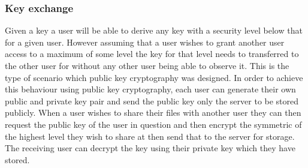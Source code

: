\documentclass[12pt, titlepage]{article}
\begin{document}
\subsubsection{Key exchange}
Given a key a user will be able to derive any key with a security level below that for a given user. However assuming that a user wishes to grant another user access to a maximum of some level the key for that level needs to transferred to the other user for without any other user being able to observe it. This is the type of scenario which public key cryptography was designed. In order to achieve this behaviour using public key cryptography, each user can generate their own public and private key pair and send the public key only the server to be stored publicly. When a user wishes to share their files with another user they can then request the public key of the user in question and then encrypt the symmetric of the highest level they wish to share at then send that to the server for storage. The receiving user can decrypt the key using their private key which they have stored.
\end{document}
